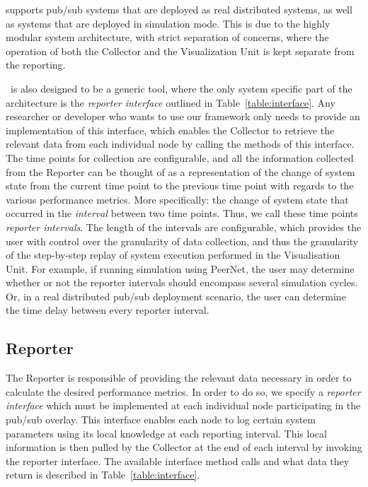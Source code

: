 \demo{} supports pub/sub systems that are deployed as
real distributed systems, as well as systems that are deployed in
simulation mode. This is due to the highly modular system architecture,
with strict separation of concerns, where the operation of both the
Collector and the Visualization Unit is kept separate from the reporting.

\demo~is also designed to be a generic tool, where the only system
specific part of the architecture is the \emph{reporter interface}
outlined in Table~\ref{table:interface}. Any researcher or developer who
wants to use our framework only needs to provide an implementation of
this interface, which enables the Collector to retrieve the relevant
data from each individual node by calling the methods of this
interface. The time points for collection are configurable, and all the
information collected from the Reporter can be thought of as a
representation of the change of system state from the current time point
to the previous time point with regards to the various performance
metrics. More specifically: the change of system state that occurred in
the \emph{interval} between two time points. Thus, we call these time
points \emph{reporter intervals}. The length of the intervals are
configurable, which provides the user with control over the granularity
of data collection, and thus the granularity of the step-by-step replay
of system execution performed in the Visualisation Unit. For example, if
running simulation using PeerNet, the user may determine whether or not
the reporter intervals should encompass several simulation cycles. Or,
in a real distributed pub/sub deployment scenario, the user can
determine the time delay between every reporter interval.


\subsection{Reporter}

The Reporter is responsible of providing the relevant data necessary in
order to calculate the desired performance metrics. In order to do so,
we specify a \emph{reporter interface} which must be implemented at each
individual node participating in the pub/sub overlay. This interface
enables each node to log certain system parameters using its local
knowledge at each reporting interval. This local information is then pulled
by the Collector at the end of each interval by invoking the
reporter interface. The available interface method calls and what data
they return is described in Table~\ref{table:interface}.

